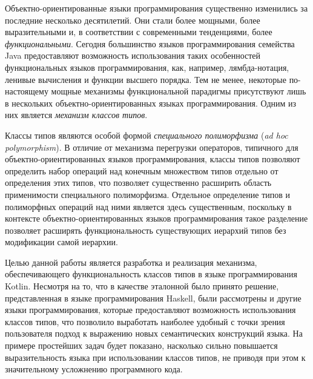 \intro

Объектно-ориентированные языки программирования существенно изменились за последние несколько десятилетий. Они стали более мощными, более выразительными и, в соответствии с современными тенденциями, более \emph{функциональными}. Сегодня большинство языков программирования семейства Java предоставляют возможность использования таких особенностей функциональных языков программирования, как, например, лямбда-нотация, ленивые вычисления и функции высшего порядка. Тем не менее, некоторые по-настоящему мощные механизмы функциональной парадигмы присутствуют лишь в нескольких объектно-ориентированных языках программирования. Одним из них является \emph{механизм классов типов}.

Классы типов являются особой формой \emph{специального полиморфизма} (\emph{ad hoc polymorphism}). В отличие от механизма перегрузки операторов, типичного для объектно-ориентированных языков программирования, классы типов позволяют определить набор операций над конечным множеством типов отдельно от определения этих типов, что позволяет существенно расширить область применимости специального полиморфизма. Отдельное определение типов и полиморфных операций над ними является здесь существенным, поскольку в контексте объектно-ориентированных языков программирования такое разделение позволяет расширять функциональность существующих иерархий типов без модификации самой иерархии.   

Целью данной работы является разработка и реализация механизма, обеспечивающего функциональность классов типов в языке программирования Kotlin. Несмотря на то, что в качестве эталонной было принято решение, представленная в языке программирования Haskell, были рассмотрены и другие языки программирования, которые предоставляют возможность использования классов типов, что позволило выработать наиболее удобный с точки зрения пользователя подход к выражению новых семантических конструкций языка. На примере простейших задач будет показано, насколько сильно повышается выразительность языка при использовании классов типов, не приводя при этом к значительному усложнению программного кода.


